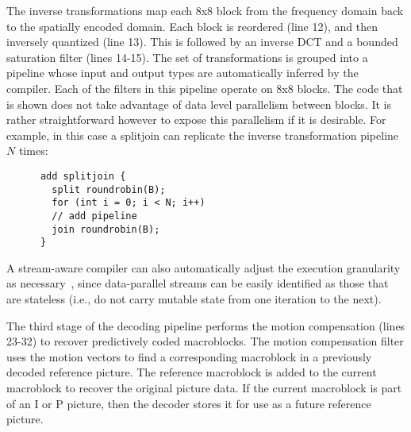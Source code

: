 The inverse transformations map each 8x8 block from the frequency
domain back to the spatially encoded domain. Each block is reordered
(line 12), and then inversely quantized (line 13). This is followed by
an inverse DCT and a bounded saturation filter (lines 14-15). The set
of transformations is grouped into a pipeline whose input
and output types are automatically inferred by the compiler. Each of
the filters in this pipeline operate on 8x8 blocks. The code that is
shown does not take advantage of data level parallelism between
blocks. It is rather straightforward however to expose this
parallelism if it is desirable. For example, in this case a splitjoin
can replicate the inverse transformation pipeline $N$ times:
\begin{center}
  \begin{scriptsize}
    \begin{verbatim}
      add splitjoin {
        split roundrobin(B);
        for (int i = 0; i < N; i++) 
        // add pipeline
        join roundrobin(B);
      }
    \end{verbatim}
  \end{scriptsize}
\end{center}
\vspace{-12pt}
A stream-aware compiler can also automatically adjust the execution
granularity as necessary~\cite{gordon02asplos}, since data-parallel streams
can be easily identified as those that are stateless (i.e., do not
carry mutable state from one iteration to the next).

The third stage of the decoding pipeline performs the motion
compensation (lines 23-32) to recover predictively coded
macroblocks. The motion compensation filter uses the motion vectors to
find a corresponding macroblock in a previously decoded reference
picture. The reference macroblock is added to the current macroblock
to recover the original picture data. If the current macroblock is
part of an I or P picture, then the decoder stores it for use as a
future reference picture.

